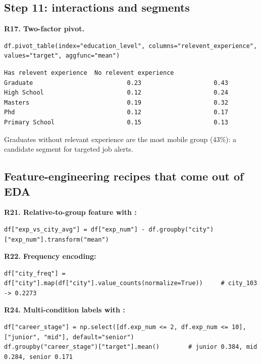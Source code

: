 \subsection{Step 11: interactions and segments}
\textbf{R17. Two-factor pivot.}
\begin{lstlisting}
df.pivot_table(index="education_level", columns="relevent_experience", values="target", aggfunc="mean")
\end{lstlisting}
\outlabel
\begin{lstlisting}[style=out]
                 Has relevent experience  No relevent experience
Graduate                          0.23                    0.43
High School                       0.12                    0.24
Masters                           0.19                    0.32
Phd                               0.12                    0.17
Primary School                    0.15                    0.13
\end{lstlisting}
Graduates without relevant experience are the most mobile group (43\%): a candidate segment for targeted job alerts.

\subsection{Feature-engineering recipes that come out of EDA}
\textbf{R21. Relative-to-group feature with :}
\begin{lstlisting}
df["exp_vs_city_avg"] = df["exp_num"] - df.groupby("city")["exp_num"].transform("mean")
\end{lstlisting}
\textbf{R22. Frequency encoding:}
\begin{lstlisting}
df["city_freq"] = df["city"].map(df["city"].value_counts(normalize=True))     # city_103 -> 0.2273
\end{lstlisting}
\textbf{R24. Multi-condition labels with :}
\begin{lstlisting}
df["career_stage"] = np.select([df.exp_num <= 2, df.exp_num <= 10], ["junior", "mid"], default="senior")
df.groupby("career_stage")["target"].mean()        # junior 0.384, mid 0.284, senior 0.171
\end{lstlisting}

